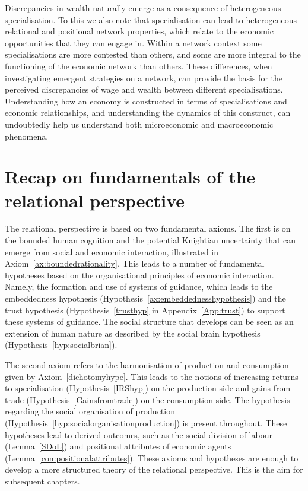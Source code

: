 
Discrepancies in wealth naturally emerge as a consequence of heterogeneous specialisation. To this we also note that specialisation can lead to heterogeneous relational and positional network properties, which relate to the economic opportunities that they can engage in. Within a network context some specialisations are more contested than others, and some are more integral to the functioning of the economic network than others. These differences, when investigating emergent strategies on a network, can provide the basis for the perceived discrepancies of wage and wealth between different specialisations. Understanding how an economy is constructed in terms of specialisations and economic relationships, and understanding the dynamics of this construct, can undoubtedly help us understand both microeconomic and macroeconomic phenomena.

\section{Recap on fundamentals of the relational perspective}
\label{sec:fundamentalsRelationalPerspective}

The relational perspective is based on two fundamental axioms. The first is on the bounded human cognition and the potential Knightian uncertainty that can emerge from social and economic interaction, illustrated in Axiom~\ref{ax:boundedrationality}. This leads to a number of fundamental hypotheses based on the organisational principles of economic interaction. Namely, the formation and use of systems of guidance, which leads to the embeddedness hypothesis (Hypothesis~\ref{ax:embeddednesshypothesis}) and the trust hypothesis (Hypothesis~\ref{trusthyp} in Appendix~\ref{App:trust}) to support these systems of guidance. The social structure that develops can be seen as an extension of human nature as described by the social brain hypothesis (Hypothesis~\ref{hyp:socialbrian}).

The second axiom refers to the harmonisation of production and consumption given by Axiom~\ref{dichotomyhype}. This leads to the notions of increasing returns to specialisation (Hypothesis~\ref{IRShyp}) on the production side and gains from trade (Hypothesis~\ref{Gainsfromtrade}) on the consumption side. The hypothesis regarding the social organisation of production (Hypothesis~\ref{hyp:socialorganisationproduction}) is present throughout. These hypotheses lead to derived outcomes, such as the social division of labour (Lemma~\ref{SDoL}) and positional attributes of economic agents (Lemma~\ref{con:positionalattributes}). These axioms and hypotheses are enough to develop a more structured theory of the relational perspective. This is the aim for subsequent chapters.

